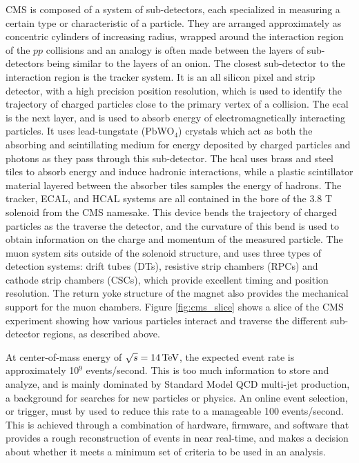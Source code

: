 \par CMS is composed of a system of sub-detectors, each
specialized in measuring a certain type or characteristic of a
particle.  They are arranged approximately as concentric cylinders of
increasing radius, wrapped around the interaction region of the $pp$
collisions and an analogy is often made between the layers of
sub-detectors being similar to the layers of an onion. The closest 
sub-detector to the interaction region is the tracker system.  It is
an all silicon pixel and strip detector, with a high precision 
position resolution, which is used to identify the trajectory of
charged particles close to the primary vertex of a collision.  The
\acrfull{ecal} is the next layer, and is used to absorb energy of
electromagnetically interacting particles.  It uses lead-tungstate
(PbWO$_{4}$) crystals which act as both the absorbing and scintillating
medium for energy deposited by charged particles and photons as they
pass through  this sub-detector.  The \acrfull{hcal} uses brass and
steel tiles to absorb energy and induce hadronic interactions, while a
plastic scintillator material layered between the absorber tiles
samples the energy of hadrons.  The tracker, ECAL, and HCAL systems
are all contained in the bore of the 3.8 T solenoid from the CMS
namesake.  This device bends the trajectory of charged particles as
the traverse the detector, and the curvature of this bend is used to
obtain information on the charge and momentum of the measured
particle.  The muon system sits outside of the solenoid structure, and
uses three types of detection systems: drift tubes (DTs), resistive
strip chambers (RPCs) and cathode strip chambers (CSCs), which provide
excellent timing and position resolution.  The return yoke structure of
the magnet also provides the mechanical support for the muon
chambers.  Figure \ref{fig:cms_slice} shows a slice of the CMS
experiment showing how various particles interact and traverse the different
sub-detector regions, as described above.  

\par At center-of-mass energy of $\sqrt{s}=14 \,\text{Te\hspace{-.08em}V}$, the expected
event rate is approximately 10$^{9}$ events/second.  This is too much
information to store and analyze, and is mainly dominated by Standard
Model QCD multi-jet production, a background for searches for new
particles or physics.  An online event selection, or trigger, must by
used to reduce this rate to a manageable 100 events/second.  This is
achieved through a combination of hardware, firmware, and software
that provides a rough reconstruction of events in near real-time, and
makes a decision about whether it meets a minimum set of criteria to
be used in an analysis.  


